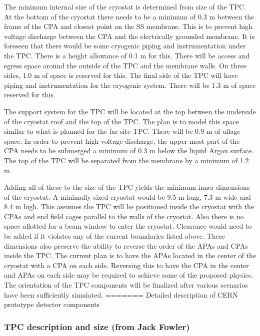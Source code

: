 The minimum internal size of the cryostat is determined from size of the TPC.  At the bottom of the 
cryostat there needs to be a minimum of 0.3 m between the frame of the CPA and closest point on the SS membrane.  This is to prevent high voltage discharge between the CPA and the electrically grounded membrane. It is foreseen that there would be some cryogenic piping and instrumentation under the TPC.  There is a height allowance of 0.1 m for this.  There will be access and egress space around the outside of the TPC and the membrane walls.  On three sides, 1.0 m of space is reserved for this.  The final side of the TPC will have piping and instrumentation for the cryogenic system.  There will be 1.3 m of space reserved for this.  

The support system for the TPC will be located at the top between the underside of the cryostat roof and  the top of the TPC.  The plan is to model this space similar to what is planned for the far site TPC.  There will be 0.9 m of ullage space.  In order to prevent high voltage discharge, the upper most part of the CPA needs to be submerged a minimum of 0.3 m below the liquid Argon surface.  The top of the TPC will be separated from the membrane by a minimum of 1.2 m.  

Adding all of these to the size of the TPC yields the minimum inner dimensions of the cryostat.  A minimally sized cryostat would be 9.5 m long, 7.3 m wide and 8.4 m high.  This assumes the TPC will be positioned inside the cryostat with the CPAs and end field cages parallel to the walls of the cryostat.  Also there is no space allotted for a beam window to enter the cryostat.  Clearance would need to be added if it violates any of the current boundaries listed above.  
These dimensions also preserve the ability to reverse the order of the APAs and CPAs inside the TPC.  The current plan is to have the APAs located in the center of the cryostat with a CPA on each side.  Reversing this to have the CPA in the center and APAs on each side may be required to achieve some of the proposed physics.  The orientation of the TPC components will be finalized after various scenarios have been sufficiently simulated.  
=======
Detailed description of CERN prototype detector components
\subsubsection{TPC description and size (from Jack Fowler)}

